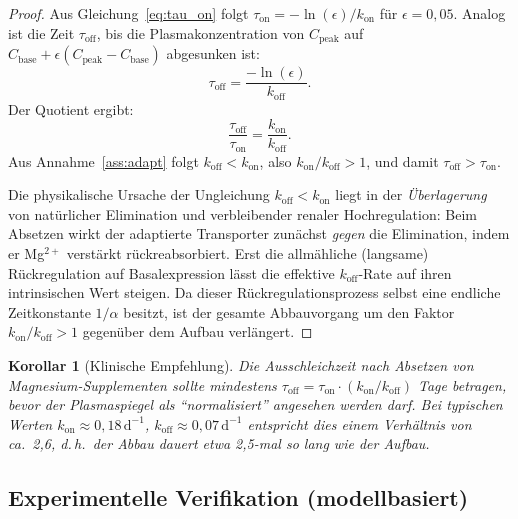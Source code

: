 ﻿\documentclass[12pt,a4paper]{article}
\theoremstyle{plain}
\newtheorem{corollary}[theorem]{Korollar}
\theoremstyle{definition}
\theoremstyle{remark}
\begin{document}
\begin{proof}
Aus Gleichung~\eqref{eq:tau_on} folgt
$\tau_\text{on} = -\ln(\epsilon)/k_\text{on}$ für $\epsilon = 0{,}05$.
Analog ist die Zeit $\tau_\text{off}$, bis die Plasmakonzentration von
$C_\text{peak}$ auf $C_\text{base} + \epsilon (C_\text{peak}-C_\text{base})$
abgesunken ist:
\begin{equation}
  \tau_\text{off} = \frac{-\ln(\epsilon)}{k_\text{off}}.
\end{equation}
Der Quotient ergibt:
\begin{equation}
  \frac{\tau_\text{off}}{\tau_\text{on}} = \frac{k_\text{on}}{k_\text{off}}.
  \label{eq:ratio}
\end{equation}
Aus Annahme~\ref{ass:adapt} folgt $k_\text{off} < k_\text{on}$, also
$k_\text{on}/k_\text{off} > 1$, und damit $\tau_\text{off} > \tau_\text{on}$.

\medskip
Die physikalische Ursache der Ungleichung $k_\text{off} < k_\text{on}$ liegt
in der \emph{Überlagerung} von natürlicher Elimination und verbleibender
renaler Hochregulation: Beim Absetzen wirkt der adaptierte Transporter
zunächst \emph{gegen} die Elimination, indem er Mg$^{2+}$ verstärkt
rückreabsorbiert. Erst die allmähliche (langsame) Rückregulation auf
Basalexpression lässt die effektive $k_\text{off}$-Rate auf ihren
intrinsischen Wert steigen. Da dieser Rückregulationsprozess selbst eine
endliche Zeitkonstante $1/\alpha$ besitzt, ist der gesamte Abbauvorgang um
den Faktor $k_\text{on}/k_\text{off} > 1$ gegenüber dem Aufbau verlängert.
\end{proof}

\begin{corollary}[Klinische Empfehlung]
\label{cor:mg_clin}
Die Ausschleichzeit nach Absetzen von Magnesium-Supplementen sollte
mindestens $\tau_\text{off} = \tau_\text{on} \cdot (k_\text{on}/k_\text{off})$
Tage betragen, bevor der Plasmaspiegel als ``normalisiert'' angesehen werden darf.
Bei typischen Werten $k_\text{on} \approx 0{,}18\,\text{d}^{-1}$,
$k_\text{off} \approx 0{,}07\,\text{d}^{-1}$ entspricht dies einem Verhältnis
von ca.\ 2{,}6, d.\,h.\ der Abbau dauert etwa 2,5-mal so lang wie der Aufbau.
\end{corollary}

\subsection{Experimentelle Verifikation (modellbasiert)}
\label{ssec:mg_exp}
\end{document}
